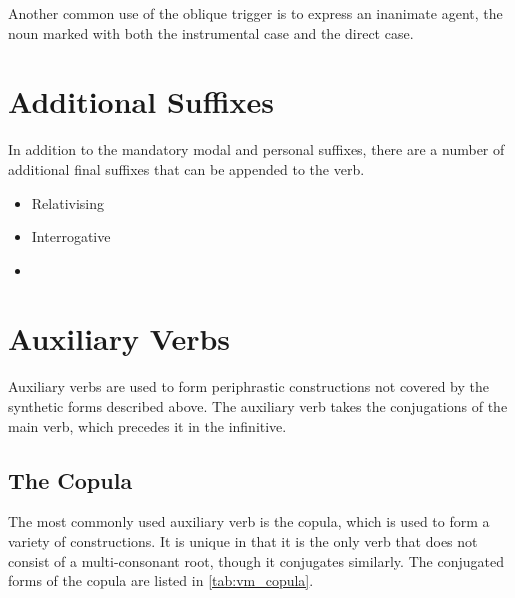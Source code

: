 \documentclass[grammar]{subfiles}
\begin{document}
Another common use of the oblique trigger is to express an inanimate agent, the
noun marked with both the instrumental case and the direct case.

\newpage
\section{Additional Suffixes}
\label{sec:vm_additional_suffixes}

In addition to the mandatory modal and personal suffixes, there are a number of
additional final suffixes that can be appended to the verb. 

\begin{itemize}
  \item Relativising 
  \item Interrogative 
  \item \ToBeWritten
\end{itemize}

\newpage
\section{Auxiliary Verbs}
\label{sec:vm_auxiliary}

Auxiliary verbs are used to form periphrastic constructions not covered by the
synthetic forms described above.  The auxiliary verb takes the conjugations of
the main verb, which precedes it in the infinitive.  

\subsection{The Copula}
\label{ssec:vm_copula}

The most commonly used auxiliary verb is the copula, which is used to form a
variety of constructions.  It is unique in that it is the only verb that does
not consist of a multi-consonant root, though it conjugates similarly.  The
conjugated forms of the copula are listed in \cref{tab:vm_copula}.
\end{document}
